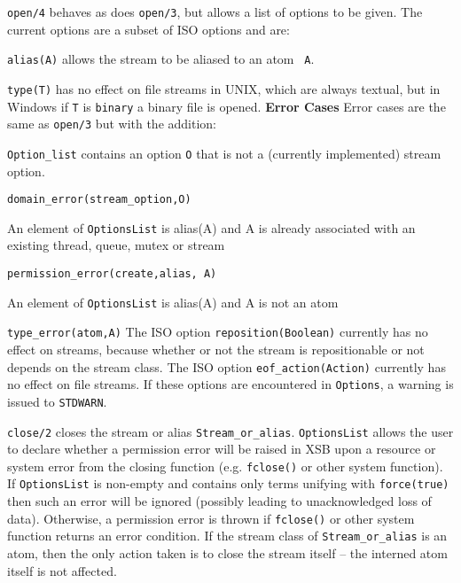 \begin{description}
%
{\tt open/4} behaves as does {\tt open/3}, but allows a list of
options to be given.  The current options are a subset of ISO options
and are:
\bi
\item {\tt alias(A)} allows the stream to be aliased to an atom {\tt
  A}.
%
\item {\tt type(T)} has no effect on file streams in UNIX, which are
  always textual, but in Windows if {\tt T} is {\tt binary} a binary
  file is opened.
\ei
%
{\bf Error Cases}  Error cases are the same as {\tt open/3} but with
the addition: 
\bi
\item {\tt Option\_list} contains an option {\tt O} that is not a
  (currently implemented) stream option.  
\bi
\item {\tt domain\_error(stream\_option,O)}
\ei
\item An element of {\tt OptionsList} is alias(A) and A is already
  associated with an existing thread, queue, mutex or stream 
\bi
\item {\tt permission\_error(create,alias, A)}
\ei
\item An element of {\tt OptionsList} is alias(A) and A is not an atom
\bi
\item {\tt type\_error(atom,A)}
\ei
\ei
%
\compatibility 
%
The ISO option {\tt reposition(Boolean)} currently has no effect on
streams, because whether or not the stream is repositionable or not
depends on the stream class.  The ISO option {\tt eof\_action(Action)}
currently has no effect on file streams.  If these options are
encountered in {\tt Options}, a warning is issued to {\tt STDWARN}.

%
{\tt close/2} closes the stream or alias {\tt Stream\_or\_alias}.
{\tt OptionsList} allows the user to declare whether a permission
error will be raised in XSB upon a resource or system error from the
closing function (e.g. {\tt fclose()} or other system function).  If
{\tt OptionsList} is non-empty and contains only terms unifying with
{\tt force(true)} then such an error will be ignored (possibly leading
to unacknowledged loss of data).  Otherwise, a permission error is
thrown if {\tt fclose()} or other system function returns an error
condition.  If the stream class of {\tt Stream\_or\_alias} is an atom,
then the only action taken is to close the stream itself -- the
interned atom itself is not affected.


\end{description}
